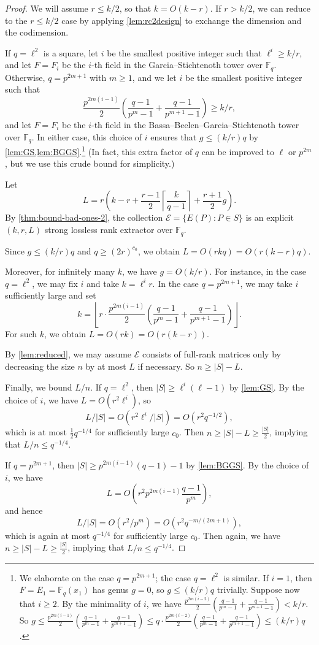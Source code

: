 \documentclass[11pt]{article}
\newcommand{\F}{\mathbb{F}}
\begin{document}
\begin{proof}
We will assume $r\leq k/2$, so that $k=O(k-r)$. If $r>k/2$, we can reduce to the $r\leq k/2$ case by applying \cref{lem:rc2design} to exchange the dimension and the codimension.

If $q=\ell^2$ is a square, let $i$ be the smallest positive integer such that $\ell^i\ge k/r$, and let $F=F_i$ be the $i$-th field in the Garcia--Stichtenoth tower over $\F_q$.
Otherwise, $q=p^{2m+1}$ with $m\ge 1$, and we let $i$ be the smallest positive integer such that
\[
\frac{p^{2m(i-1)}}{2}\left(\frac{q-1}{p^{m}-1}+\frac{q-1}{p^{m+1}-1}\right)\ge k/r,
\]
and let $F=F_i$ be the $i$-th field in the Bassa--Beelen--Garcia--Stichtenoth tower over $\F_q$.
In either case, this choice of $i$ ensures that $g\le (k/r)q$ by \cref{lem:GS,lem:BGGS}.\footnote{We elaborate on the case $q=p^{2m+1}$; the case $q=\ell^2$ is similar. If $i=1$, then $F=E_1=\F_q(x_1)$ has genus $g=0$, so $g\leq (k/r)q$ trivially. Suppose now that $i\geq 2$. By the minimality of $i$, we have $\frac{p^{2m(i-2)}}{2}\left(\frac{q-1}{p^{m}-1}+\frac{q-1}{p^{m+1}-1}\right)<k/r$. So $g\leq \frac{p^{2m(i-1)}}{2}\left(\frac{q-1}{p^{m}-1}+\frac{q-1}{p^{m+1}-1}\right)\leq q\cdot \frac{p^{2m(i-2)}}{2}\left(\frac{q-1}{p^{m}-1}+\frac{q-1}{p^{m+1}-1}\right)\leq (k/r)q$.}
(In fact, this extra factor of $q$ can be improved to $\ell$ or $p^{2m}$, but we use this crude bound for simplicity.)

Let
\[
L=r\left(
k-r+\frac{r-1}{2}\left\lceil \frac{k}{q-1}\right\rceil+\frac{r+1}{2}g
\right).
\]
By \cref{thm:bound-bad-ones-2}, the collection $\mathcal{E}=\{E(P): P\in S\}$ is an explicit $(k,r,L)$ strong lossless rank extractor over $\F_q$.

Since $g\le (k/r)q$ and $q\ge (2r)^{c_0}$, we obtain $L=O(rkq)=O(r(k-r)q)$.

Moreover, for infinitely many $k$, we have $g=O(k/r)$. For instance, in the case $q=\ell^2$, we may fix $i$ and take $k=\ell^i r$. In the case $q=p^{2m+1}$, we may take $i$ sufficiently large and set
\[
k=\left\lfloor r\cdot \frac{p^{2m(i-1)}}{2}\left(\frac{q-1}{p^{m}-1}+\frac{q-1}{p^{m+1}-1}\right)\right\rfloor.
\]
For such $k$, we obtain $L=O(rk)=O(r(k-r))$.

By \cref{lem:reduced}, we may assume $\mathcal{E}$ consists of full-rank matrices only by decreasing the size $n$ by at most $L$ if necessary. So $n\geq |S|-L$.

Finally, we bound $L/n$. If $q=\ell^2$, then $|S|\ge \ell^i(\ell-1)$ by \cref{lem:GS}. By the choice of $i$, we have $L=O(r^2\ell^i)$, so
\[
L/|S|=O(r^2\ell^i/|S|)=O(r^2q^{-1/2}),
\]
which is at most $\frac{1}{2}q^{-1/4}$ for sufficiently large $c_0$.
Then $n\geq |S|-L\geq \frac{|S|}{2}$, implying that $L/n\leq q^{-1/4}$.

If $q=p^{2m+1}$, then $|S|\ge p^{2m(i-1)}(q-1)-1$ by \cref{lem:BGGS}. By the choice of $i$, we have
\[
L=O\!\left(r^2 p^{2m(i-1)}\frac{q-1}{p^m}\right),
\]
and hence
\[
L/|S|=O(r^2/p^m)=O\!\left(r^2 q^{-m/(2m+1)}\right),
\]
which is again at most $q^{-1/4}$ for sufficiently large $c_0$. Then again, we have $n\geq |S|-L\geq \frac{|S|}{2}$, implying that $L/n\leq q^{-1/4}$.
\end{proof}
\end{document}
